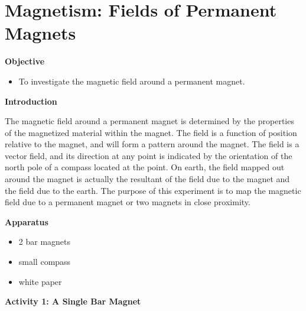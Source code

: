 
\section{Magnetism: Fields of Permanent Magnets }

\makelabheader %

\textbf{Objective}

\begin{itemize}
\item To investigate the magnetic field around a permanent magnet.
\end{itemize}
\textbf{Introduction} 

The magnetic field around a permanent magnet is determined by the properties 
of the magnetized material within the magnet. The field is a function of 
position relative to the magnet, and will form a pattern around the magnet. 
The field is a vector field, and its direction at any point is indicated by 
the orientation of the north pole of a compass located at the point. On earth, 
the field mapped out around the magnet is actually the resultant of the field 
due to the magnet and the field due to the earth. The purpose of this 
experiment is to map the magnetic field due to a permanent magnet or two 
magnets in close proximity.

\textbf{Apparatus}

\begin{itemize}
\item 2 bar magnets 
\item small compass 
\item white paper
\end{itemize}
\textbf{Activity 1: A Single Bar Magnet}

\vspace{0.3cm}
{\centering {} \par}
\vspace{0.3cm}

